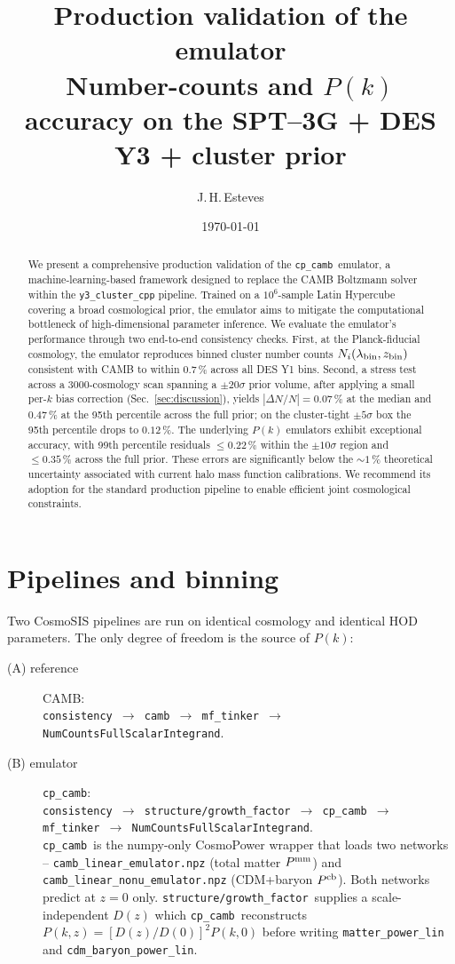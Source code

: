 \documentclass[a4paper, 11pt]{article}
\title{\vspace{-4ex}\huge \textbf{Production validation of the
       \modname{cp\_camb} emulator}\\[0.5ex]
       \Large \textbf{Number-counts and $P(k)$ accuracy on the
       SPT--3G + DES Y3 + cluster prior}}
\author{J.\,H.\,Esteves}
\date{\today}
\newcommand{\cp}{\texttt{cp\_camb}}
\newcommand{\gfmod}{\texttt{structure/growth\_factor}}
\newcommand{\mftinker}{\texttt{mf\_tinker}}
\newcommand{\ncfull}{\texttt{NumCountsFullScalarIntegrand}}
\begin{document}
\maketitle
\thispagestyle{fancy}

\begin{abstract}
  We present a comprehensive production validation of the
  \cp\ emulator, a machine-learning-based framework designed to
  replace the CAMB Boltzmann solver within the
  \texttt{y3\_cluster\_cpp} pipeline. Trained on a $10^6$-sample
  Latin Hypercube covering a broad cosmological prior, the emulator
  aims to mitigate the computational bottleneck of high-dimensional
  parameter inference. We evaluate the emulator's performance
  through two end-to-end consistency checks. First, at the
  Planck-fiducial cosmology, the emulator reproduces binned cluster
  number counts $N_i(\lambda_{\rm bin}, z_{\rm bin})$ consistent
  with CAMB to within 0.7\,\% across all DES Y1 bins. Second, a
  stress test across a 3000-cosmology scan spanning a $\pm 20\sigma$
  prior volume, after applying a small per-$k$ bias correction
  (Sec.~\ref{sec:discussion}), yields
  $|\Delta N/N| = 0.07\,\%$ at the median and $0.47\,\%$ at the
  95th percentile across the full prior; on the cluster-tight
  $\pm 5\sigma$ box the 95th percentile drops to $0.12\,\%$. The underlying
  $P(k)$ emulators exhibit exceptional accuracy, with 99th
  percentile residuals $\le 0.22\,\%$ within the $\pm 10\sigma$
  region and $\le 0.35\,\%$ across the full prior. These errors are
  significantly below the $\sim 1\,\%$ theoretical uncertainty
  associated with current halo mass function calibrations. We
  recommend its adoption for the standard production pipeline to
  enable efficient joint cosmological constraints.
\end{abstract}

\section{Pipelines and binning}
\label{sec:pipeline}

Two CosmoSIS pipelines are run on identical cosmology and identical
HOD parameters. The only degree of freedom is the source of $P(k)$:

\begin{description}
  \item[(A) reference] CAMB:\\
    \texttt{consistency $\to$ camb $\to$ \mftinker\ $\to$ \ncfull}.
  \item[(B) emulator] \texttt{cp\_camb}:\\
    \texttt{consistency $\to$ \gfmod\ $\to$ \cp\ $\to$ \mftinker\ $\to$
    \ncfull}.\\
    \cp\ is the numpy-only CosmoPower wrapper that loads two networks
    -- \texttt{camb\_linear\_emulator.npz} (total matter
    $P^{\rm mm}$) and \texttt{camb\_linear\_nonu\_emulator.npz}
    (CDM+baryon $P^{\rm cb}$). Both networks predict at $z=0$ only.
    \gfmod\ supplies a scale-independent $D(z)$ which \cp\
    reconstructs $P(k, z) = [D(z)/D(0)]^2 P(k, 0)$ before writing
    \texttt{matter\_power\_lin} and \texttt{cdm\_baryon\_power\_lin}.
\end{description}
\end{document}
